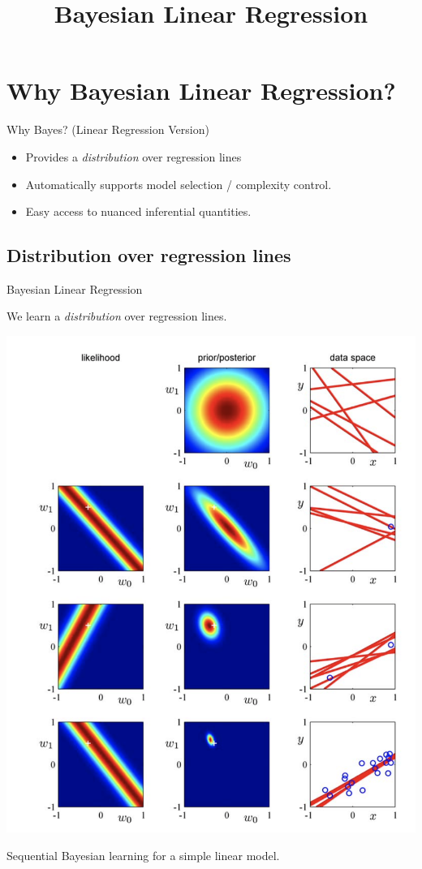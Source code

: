 \documentclass[10pt]{beamer}
\title{Bayesian Linear Regression}
\begin{document}
\maketitle

\section{Why Bayesian Linear Regression?}

\begin{frame}{Why Bayes? (Linear Regression Version)}
\begin{itemize}
\item Provides a \textit{distribution} over regression lines
\item Automatically supports model selection / complexity control.
\item Easy access to nuanced inferential quantities.
\end{itemize}
	
\end{frame}


\subsection{Distribution over regression lines}
\begin{frame}{Bayesian Linear Regression}
\scriptsize

We learn a \textit{distribution} over regression lines.

\begin{center}
\includegraphics[width=.5\textwidth]{images/bishop_bayesian_regression}

Sequential Bayesian learning for a simple linear model.

\end{center}




\end{frame}
\end{document}
